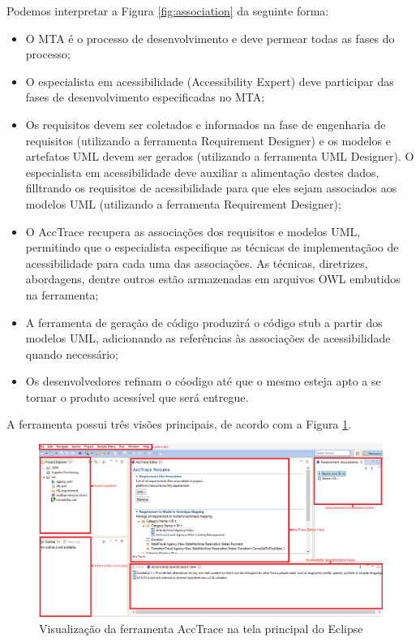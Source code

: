 \documentclass[runningheads,a4paper]{llncs}
\begin{document}
Podemos interpretar a Figura \ref{fig:association} da seguinte forma:

\begin{itemize}
  \item O MTA é o processo de desenvolvimento e deve permear todas as fases do processo;
  \item O especialista em acessibilidade (Accessibility Expert) deve participar das fases de
desenvolvimento especificadas no MTA;
  \item Os requisitos devem ser coletados e informados na fase de engenharia de requisitos
(utilizando a ferramenta Requirement Designer) e os modelos e artefatos UML
devem ser gerados (utilizando a ferramenta UML Designer). O especialista em
acessibilidade deve auxiliar a alimentação destes dados, filltrando os requisitos de
acessibilidade para que eles sejam associados aos modelos UML (utilizando a ferramenta
Requirement Designer);
  \item O AccTrace recupera as associações dos requisitos e modelos UML, permitindo que o especialista especifique as técnicas de implementaçãoo de acessibilidade para cada uma das associações. As técnicas, diretrizes, abordagens, dentre outros estão armazenadas em arquivos OWL embutidos na ferramenta;
  \item A ferramenta de geração de código produzirá o código stub a partir dos modelos
UML, adicionando as referências às associações de acessibilidade quando necessário;
  \item Os desenvolvedores refinam o cóodigo até que o mesmo esteja apto a se tornar o
produto acessível que será entregue.
\end{itemize}

A ferramenta possui três visões principais, de acordo com a Figura \ref{fig:acctrace}. 

\begin{figure}[h!]
\centering
\includegraphics[scale=0.26]{./img/acctrace.png}
\caption{Visualização da ferramenta AccTrace na tela principal do
Eclipse}
\label{fig:acctrace}
\end{figure}
\end{document}
